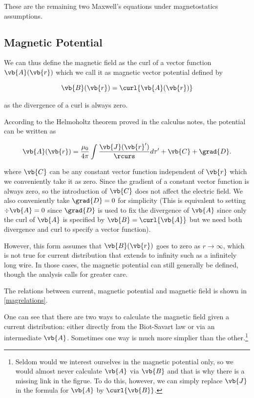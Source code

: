\documentclass[english,a4paper,12pt]{report}
\begin{document}
These are the remaining two Maxwell's equations under magnetostatics assumptions.

\subsection{Magnetic Potential}

We can thus define the magnetic field as the curl of a vector function \(\vb{A} (\vb{r} )\) which we call it as magnetic vector potential defined by 

\begin{equation}
    \vb{B} (\vb{r} ) = \curl{\vb{A} (\vb{r} )} 
\end{equation}

as the divergence of a curl is always zero.

According to the Helmoholtz theorem proved in the calculus notes, the potential can be written as  

\begin{equation}
    \vb{A} (\vb{r} ) = \frac{\mu_0}{4\pi} \int \frac{\vb{J} (\vb{r} ')}{\rcurs }d\tau ' + \vb{C} + \grad{D} . \label{magpotential} 
\end{equation}

where \(\vb{C} \) can be any constant vector function independent of \(\vb{r} \)  which we conveniently take it as zero. Since the gradient of a constant vector function is always zero, so the introduction of \(\vb{C} \) does not affect the electric field. We also conveniently take \(\grad{D} = 0\) for simplicity (This is equivalent to setting \(\div{\vb{A} } = 0 \) since \(\grad{D} \) is used to fix the divergence of \(\vb{A} \) since only the curl of \(\vb{A} \) is specified by \(\vb{B} = \curl{\vb{A} } \) but we need both divergence and curl to specify a vector function).  

However, this form assumes that \(\vb{B} (\vb{r} )\) goes to zero as \(r \to \infty\), which is not true for current distribution that extends to infinity such as a infinitely long wire. In those cases, the magnetic potential can still generally be defined, though the analysis calls for greater care.  

The relations between current, magnetic potential and magnetic field is shown in \cref{magrelations}. 


One can see that there are two ways to calculate the magnetic field given a current distribution: either directly from the Biot-Savart law or via an intermediate \(\vb{A} \). Sometimes one way is much more simplier than the other.\footnote{Seldom would we interest ourselves in the magnetic potential only, so we would almost never calculate \(\vb{A} \) via \(\vb{B} \) and that is why there is a missing link in the figrue. To do this, however, we can simply replace \(\vb{J} \) in the formula for \(\vb{A} \) by \(\curl{\vb{B} } \).} 
\end{document}
